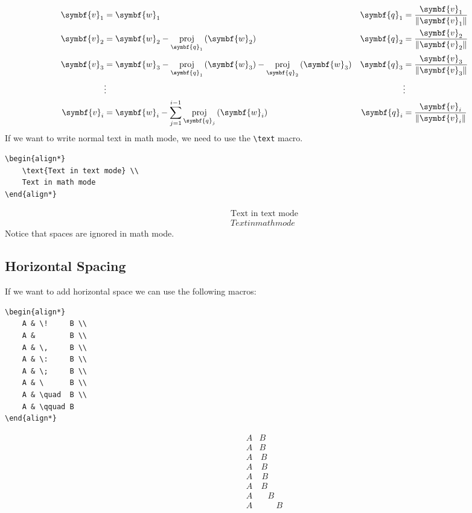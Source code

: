 \documentclass[11pt, twoside]{article}
\DeclareMathOperator{\proj}{proj}
\begin{document}
\begin{align*}
    \symbf{v}_1 & = \symbf{w}_1                                                                                                   & \symbf{q}_1 & = \frac{\symbf{v}_1}{\norm{\symbf{v}_1}} \\
    \symbf{v}_2 & = \symbf{w}_2 - \proj_{\symbf{q}_1} \left( \symbf{w}_2 \right)                                                  & \symbf{q}_2 & = \frac{\symbf{v}_2}{\norm{\symbf{v}_2}} \\
    \symbf{v}_3 & = \symbf{w}_3 - \proj_{\symbf{q}_1} \left( \symbf{w}_3 \right) - \proj_{\symbf{q}_2} \left( \symbf{w}_3 \right) & \symbf{q}_3 & = \frac{\symbf{v}_3}{\norm{\symbf{v}_3}} \\
                & \vdots                                                                                                          &             & \vdots                                   \\
    \symbf{v}_i & = \symbf{w}_i - \sum_{j = 1}^{i - 1} \proj_{\symbf{q}_j} \left( \symbf{w}_i \right)                             & \symbf{q}_i & = \frac{\symbf{v}_i}{\norm{\symbf{v}_i}}
\end{align*}
If we want to write normal text in math mode, we need to use the \lstinline{\text} macro.
\begin{lstlisting}
\begin{align*}
    \text{Text in text mode} \\
    Text in math mode
\end{align*}
\end{lstlisting}
\begin{align*}
    \text{Text in text mode} \\
    Text in math mode
\end{align*}
Notice that spaces are ignored in math mode.
\subsection{Horizontal Spacing}
If we want to add horizontal space we can use the following macros:
\begin{lstlisting}
\begin{align*}
    A & \!     B \\
    A &        B \\
    A & \,     B \\
    A & \:     B \\
    A & \;     B \\
    A & \      B \\
    A & \quad  B \\
    A & \qquad B
\end{align*}
\end{lstlisting}
\begin{align*}
    A & \!     B \\
    A & B        \\
    A & \,     B \\
    A & \:     B \\
    A & \;     B \\
    A & \      B \\
    A & \quad  B \\
    A & \qquad B
\end{align*}
\end{document}
